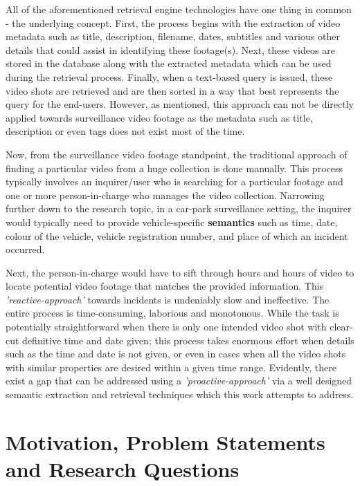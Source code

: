 All of the aforementioned retrieval engine technologies have one thing in common - the underlying concept. First, the process begins with the extraction of video metadata such as title, description, filename, dates, subtitles and various other details that could assist in identifying these footage(s). Next, these videos are stored in the database along with the extracted metadata which can be used during the retrieval process. Finally, when a text-based query is issued, these video shots are retrieved and are then sorted in a way that best represents the query for the end-users.
However, as mentioned, this approach can not be directly applied towards surveillance video footage as the metadata such as title, description or even tags does not exist most of the time.

Now, from the surveillance video footage standpoint, the traditional approach of finding a particular video from a huge collection is done manually. This process typically involves an inquirer/user who is searching for a particular footage and one or more person-in-charge who manages the video collection. Narrowing further down to the research topic, in a car-park surveillance setting, the inquirer would typically need to provide vehicle-specific \textbf{semantics} such as time, date, colour of the vehicle, vehicle registration number, and place of which an incident occurred. %

Next, the person-in-charge would have to sift through hours and hours of video to locate potential video footage that matches the provided information. This \textit{'reactive-approach'} towards incidents is undeniably slow and ineffective. The entire process is time-consuming, laborious and monotonous. While the task is potentially straightforward when there is only one intended video shot with clear-cut definitive time and date given; this process takes enormous effort when details such as the time and date is not given, or even in cases when all the video shots with similar properties are desired within a given time range. Evidently, there exist a gap that can be addressed using a \textit{'proactive-approach'} via a well designed semantic extraction and retrieval techniques which this work attempts to address.

\section{Motivation, Problem Statements and Research Questions}

